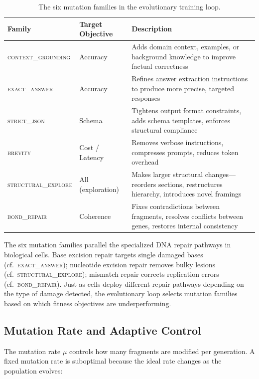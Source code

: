 \begin{table}[H]
\centering
\caption{The six mutation families in the evolutionary training loop.}
\label{tab:evo-mutation-families}
\begin{tabularx}{\textwidth}{l l Y}
\toprule
\textbf{Family} & \textbf{Target Objective} & \textbf{Description} \\
\midrule
\textsc{context\_grounding} & Accuracy & Adds domain context, examples, or background knowledge to improve factual correctness \\
\textsc{exact\_answer} & Accuracy & Refines answer extraction instructions to produce more precise, targeted responses \\
\textsc{strict\_json} & Schema & Tightens output format constraints, adds schema templates, enforces structural compliance \\
\textsc{brevity} & Cost / Latency & Removes verbose instructions, compresses prompts, reduces token overhead \\
\textsc{structural\_explore} & All (exploration) & Makes larger structural changes---reorders sections, restructures hierarchy, introduces novel framings \\
\textsc{bond\_repair} & Coherence & Fixes contradictions between fragments, resolves conflicts between genes, restores internal consistency \\
\bottomrule
\end{tabularx}
\end{table}

\begin{bioinsight}
The six mutation families parallel the specialized DNA repair pathways in biological cells. Base excision repair targets single damaged bases (cf.\ \textsc{exact\_answer}); nucleotide excision repair removes bulky lesions (cf.\ \textsc{structural\_explore}); mismatch repair corrects replication errors (cf.\ \textsc{bond\_repair}). Just as cells deploy different repair pathways depending on the type of damage detected, the evolutionary loop selects mutation families based on which fitness objectives are underperforming.
\end{bioinsight}

\subsection{Mutation Rate and Adaptive Control}

The mutation rate $\mu$ controls how many fragments are modified per generation. A fixed mutation rate is suboptimal because the ideal rate changes as the population evolves:


